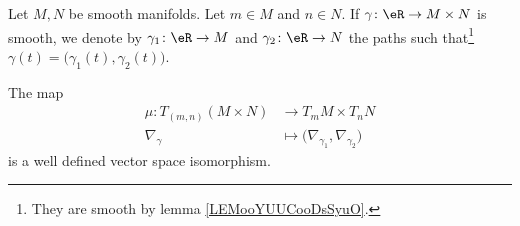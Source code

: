 \begin{proposition}	\label{PROPooPSELooDDwFru}
	Let \( M,N\) be smooth manifolds. Let \( m\in M\) and \( n\in N\). If \(\gamma \colon \eR\to M\times N  \) is smooth, we denote by \(\gamma_1 \colon \eR\to M  \) and \(\gamma_2 \colon \eR\to N  \) the paths such that\footnote{They are smooth by lemma \ref{LEMooYUUCooDsSyuO}.} \( \gamma(t)=\big( \gamma_1(t),\gamma_2(t) \big)\).

	The map
	\begin{equation}		\label{EQooYNFOooMqKQuQ}
		\begin{aligned}
			\mu\colon T_{(m,n)}(M\times N) & \to T_mM\times T_nN                                     \\
			\nabla_{\gamma}                & \mapsto \big( \nabla_{\gamma_1},\nabla_{\gamma_2} \big)
		\end{aligned}
	\end{equation}
	is a well defined vector space isomorphism.
\end{proposition}

